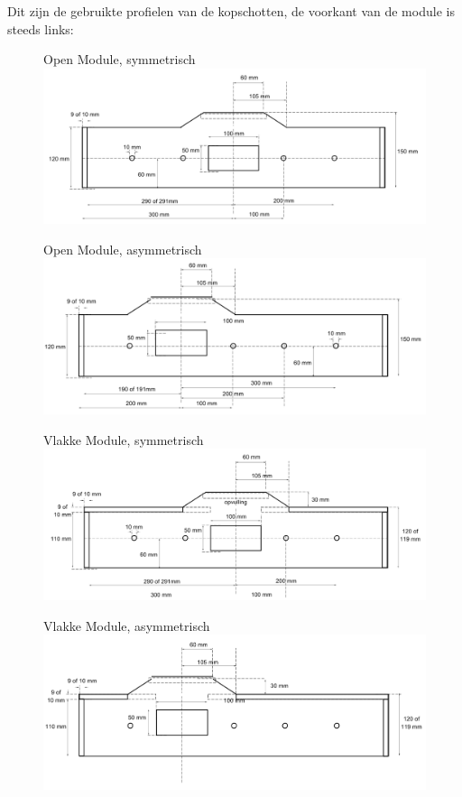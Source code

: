 \documentclass[12pt,a4paper]{report}
\begin{document}
Dit zijn de gebruikte profielen van de kopschotten, de voorkant van de module is steeds links:

\begin{figure}[ht]
  \captionbox
  {Open Module, symmetrisch}
  {\includegraphics[scale=0.25]{images/rcu_open_sym}}
\end{figure}

\begin{figure}[ht]
  \captionbox
  {Open Module, asymmetrisch}
  {\includegraphics[scale=0.25]{images/rcu_open_asym}}
\end{figure}

\begin{figure}[ht]
  \captionbox
  {Vlakke Module, symmetrisch}
  {\includegraphics[scale=0.25]{images/rcu_vlak_sym}}
\end{figure}

\begin{figure}[ht]
  \captionbox
  {Vlakke Module, asymmetrisch}
  {\includegraphics[scale=0.25]{images/rcu_vlak_asym}}
\end{figure}
\end{document}
